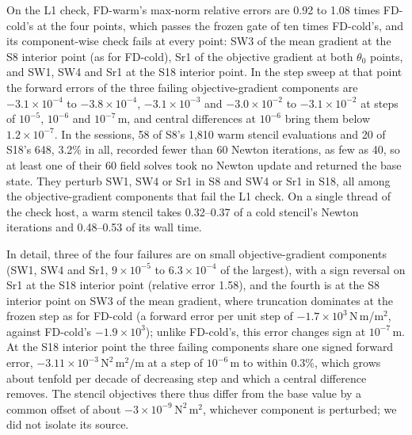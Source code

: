 \documentclass{anvil-paper}
\begin{document}
On the L1 check, FD-warm's max-norm relative errors are 0.92 to 1.08 times
FD-cold's at the four points, which passes the frozen gate of ten times FD-cold's, and
its component-wise check fails at every point: SW3 of the mean gradient at
the S8 interior point (as for FD-cold), Sr1 of the objective gradient at
both $\theta_0$ points, and SW1, SW4 and Sr1 at the S18 interior point.
In the step sweep at that point the forward errors of the three failing
objective-gradient components are $-3.1\times10^{-4}$ to $-3.8\times10^{-4}$,
$-3.1\times10^{-3}$ and $-3.0\times10^{-2}$ to $-3.1\times10^{-2}$ at steps
of $10^{-5}$, $10^{-6}$ and $10^{-7}$\,m, and central differences at
$10^{-6}$ bring them below $1.2\times10^{-7}$. In the sessions, 58 of
S8's 1,810 warm stencil evaluations and 20 of S18's 648, 3.2\% in
all, recorded fewer than 60 Newton iterations, as few as 40, so at least
one of their 60 field solves took no Newton update and returned the base
state. They perturb SW1, SW4 or Sr1 in S8 and SW4 or Sr1 in S18,
all among the objective-gradient components that fail the L1 check. On a single thread of the
check host, a warm stencil takes 0.32--0.37 of a cold stencil's Newton
iterations and 0.48--0.53 of its wall time.

In detail, three of the four failures are on small objective-gradient
components (SW1, SW4 and Sr1, $9\times10^{-5}$ to $6.3\times10^{-4}$ of the
largest), with a sign reversal on Sr1 at the S18 interior point (relative
error 1.58), and the fourth is at the S8 interior point on SW3 of the mean
gradient, where truncation dominates at the frozen step as for FD-cold (a
forward error per unit step of $-1.7\times10^{3}$\,N\,m/m$^2$, against
FD-cold's $-1.9\times10^{3}$); unlike FD-cold's, this error changes sign at
$10^{-7}$\,m. At the S18 interior point the three failing components share
one signed forward error, $-3.11\times10^{-3}\,\mathrm{N^2\,m^2/m}$ at a
step of $10^{-6}$\,m to within 0.3\%, which grows about tenfold per decade
of decreasing step and which a central difference removes. The stencil
objectives there thus differ from the base value by a common offset of
about $-3\times10^{-9}\,\mathrm{N^2\,m^2}$, whichever component is
perturbed; we did not isolate its source.
\end{document}
